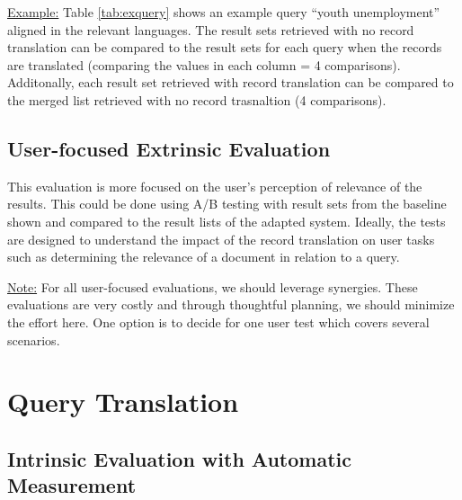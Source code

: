 \documentclass[a4paper,11pt]{article}
\begin{document}
\underline{Example:}
\newline
Table \ref{tab:exquery} shows an example query “youth unemployment” aligned in the relevant languages. The result sets retrieved with no record translation can be compared to the result sets for each query when the records are translated (comparing the values in each column = 4 comparisons). Additonally, each result set retrieved with record translation can be compared to the merged list retrieved with no record trasnaltion (4 comparisons).
\begin{table}[h]
  \caption{Example of an aligned query and baseline number of retrieved documents.}
 \label{tab:exquery}
\end{table}

\subsection{User-focused Extrinsic Evaluation}
\label{ss:user_eval}
This evaluation is more focused on the user’s perception of relevance of the results. This could be done using A/B testing with result sets from the baseline shown and compared to the result lists of the adapted system. Ideally, the tests are designed to understand the impact of the record translation on user tasks such as determining the relevance of a document in relation to a query.

\underline{Note:} For all user-focused evaluations, we should leverage synergies. These evaluations are very costly and through thoughtful planning, we should minimize the effort here. One option is to decide for one user test which covers several scenarios.

\section{Query Translation}
\subsection{Intrinsic Evaluation with Automatic Measurement}
\end{document}
